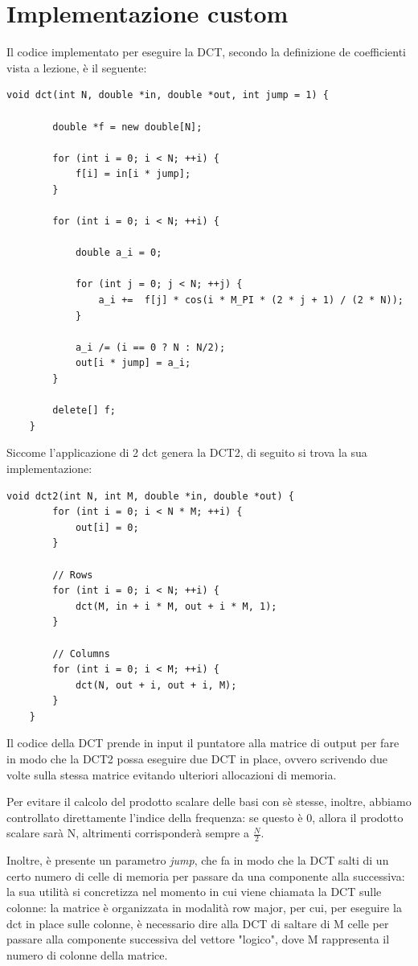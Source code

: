 \section{Implementazione custom}

Il codice implementato per eseguire la DCT, secondo la definizione de coefficienti vista a lezione, è il seguente:


\begin{lstlisting}[gobble=1]
	void dct(int N, double *in, double *out, int jump = 1) {
		
		double *f = new double[N];
		
		for (int i = 0; i < N; ++i) {
			f[i] = in[i * jump];
		}
		
		for (int i = 0; i < N; ++i) {
			
			double a_i = 0;
			
			for (int j = 0; j < N; ++j) {
				a_i +=  f[j] * cos(i * M_PI * (2 * j + 1) / (2 * N));
			}
			
			a_i /= (i == 0 ? N : N/2);
			out[i * jump] = a_i;
		}
		
		delete[] f;
	}

\end{lstlisting}

Siccome l'applicazione di 2 dct genera la DCT2, di seguito si trova la sua implementazione:

\begin{lstlisting}[gobble=1]
	void dct2(int N, int M, double *in, double *out) {
		for (int i = 0; i < N * M; ++i) {
			out[i] = 0;
		}
		
		// Rows
		for (int i = 0; i < N; ++i) {
			dct(M, in + i * M, out + i * M, 1);
		}
		
		// Columns
		for (int i = 0; i < M; ++i) {
			dct(N, out + i, out + i, M);
		}
	}
\end{lstlisting}

Il codice della DCT prende in input il puntatore alla matrice di output per fare in modo che la DCT2 possa eseguire due DCT in place, ovvero scrivendo due volte sulla stessa matrice evitando ulteriori allocazioni di memoria.

Per evitare il calcolo del prodotto scalare delle basi con sè stesse, inoltre, abbiamo controllato direttamente l'indice della frequenza: se questo è 0, allora il prodotto scalare sarà N, altrimenti corrisponderà sempre a $\frac{N}{2}$.

Inoltre, è presente un parametro \textit{jump}, che fa in modo che la DCT salti di un certo numero di celle di memoria per passare da una componente alla successiva: la sua utilità si concretizza nel momento in cui viene chiamata la DCT sulle colonne: la matrice è organizzata in modalità row major, per cui, per eseguire la dct in place sulle colonne, è necessario dire alla DCT di saltare di M celle per passare alla componente successiva del vettore "logico", dove M rappresenta il numero di colonne della matrice.


